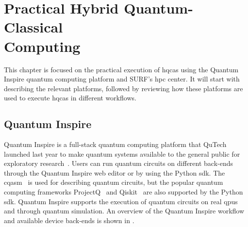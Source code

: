 \chapter[Practical Hybrid Quantum-Classical Computing]{Practical Hybrid Quantum-Classical\\Computing} \label{chap:practical-hybrid-quantum-classical-computing}
This chapter is focused on the practical execution of \glspl{hqca} using the Quantum Inspire quantum computing platform and SURF's \gls{hpc} center.
It will start with describing the relevant platforms, followed by reviewing how these platforms are used to execute \glspl{hqca} in different workflows.

\section{Quantum Inspire}
Quantum Inspire is a full-stack quantum computing platform that QuTech launched last year to make quantum systems available to the general public for exploratory research~\cite{last2020quantum}.
Users can run quantum circuits on different back-ends through the Quantum Inspire web editor or by using the Python \gls{sdk}.
The \gls{cqasm}~\cite{khammassi2018cqasm} is used for describing quantum circuits, but the popular quantum computing frameworks ProjectQ~\cite{steiger2018projectq} and Qiskit~\cite{qiskit} are also supported by the Python \gls{sdk}.
Quantum Inspire supports the execution of quantum circuits on real \glspl{qpu} and through quantum simulation.
An overview of the Quantum Inspire workflow and available device back-ends is shown in .

